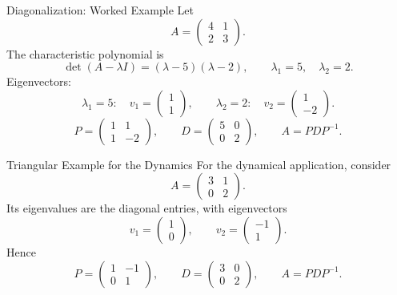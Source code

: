 \documentclass[aspectratio=169]{beamer}
\begin{document}
\begin{frame}{Diagonalization: Worked Example}
Let
\[
A=\begin{pmatrix}4&1\\2&3\end{pmatrix}.
\]
\pause
The characteristic polynomial is
\[
\det(A-\lambda I)=(\lambda-5)(\lambda-2),
\qquad \lambda_1=5,\quad \lambda_2=2.
\]
\pause
Eigenvectors:
\[
\lambda_1=5:\quad v_1=\begin{pmatrix}1\\1\end{pmatrix},
\qquad
\lambda_2=2:\quad v_2=\begin{pmatrix}1\\-2\end{pmatrix}.
\]
\pause
\[
P=\begin{pmatrix}1&1\\1&-2\end{pmatrix},
\qquad D=\begin{pmatrix}5&0\\0&2\end{pmatrix},
\qquad
A=PDP^{-1}.
\]
\end{frame}

\begin{frame}{Triangular Example for the Dynamics}
For the dynamical application, consider
\[
A=\begin{pmatrix}3&1\\0&2\end{pmatrix}.
\]
Its eigenvalues are the diagonal entries, with eigenvectors
\[
v_1=\begin{pmatrix}1\\0\end{pmatrix},
\qquad
v_2=\begin{pmatrix}-1\\1\end{pmatrix}.
\]
Hence
\[
P=\begin{pmatrix}1&-1\\0&1\end{pmatrix},
\qquad D=\begin{pmatrix}3&0\\0&2\end{pmatrix},
\qquad A=PDP^{-1}.
\]
\end{frame}
\end{document}
